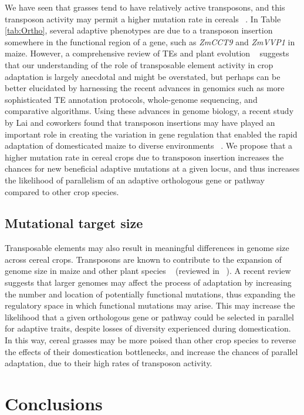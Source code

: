 \documentclass[12pt]{article}
\begin{document}
We have seen that grasses tend to have relatively active transposons, and this transposon activity may permit a higher mutation rate in cereals ~\citep{Wicker2016}. 
In Table \ref{tab:Ortho}, several adaptive phenotypes are due to a transposon insertion somewhere in the functional region of a gene, such as \textit{ZmCCT9} and \textit{ZmVVP1} in maize.
However, a comprehensive review of TEs and plant evolution ~\citep{Lisch2013} suggests that our understanding of the role of transposable element activity in crop adaptation is largely anecdotal and might be overstated, but perhaps can be better elucidated by harnessing the recent advances in genomics such as more sophisticated TE annotation protocols, whole-genome sequencing, and comparative algorithms.
Using these advances in genome biology, a recent study by Lai and coworkers found that transposon insertions may have played an important role in creating the variation in gene regulation that enabled the rapid adaptation of domesticated maize to diverse environments ~\citep{Lai2017}.  We propose that a higher mutation rate in cereal crops  due to transposon insertion increases the chances for new beneficial adaptive mutations at a given locus, and thus increases the likelihood of parallelism of an adaptive orthologous gene or pathway compared to other crop species.

\subsection*{Mutational target size}
Transposable elements may also result in meaningful differences in genome size across cereal crops.
Transposons are known to contribute to the expansion of genome size in maize and other plant species ~\citep{Tenaillon2011} (reviewed in ~\citep{Lisch2013}).
A recent review ~\citep{Mei2018} suggests that larger genomes may affect the process of adaptation by increasing the number and location of potentially functional mutations, thus expanding the regulatory space in which functional mutations may arise.
This may increase the likelihood that a given orthologous gene or pathway could be selected in parallel for adaptive traits, despite losses of diversity experienced during domestication. In this way, cereal grasses may be more poised than other crop species to reverse the effects of their domestication bottlenecks, and increase the chances of parallel adaptation, due to their high rates of transposon activity. 

\section*{Conclusions}
\end{document}
